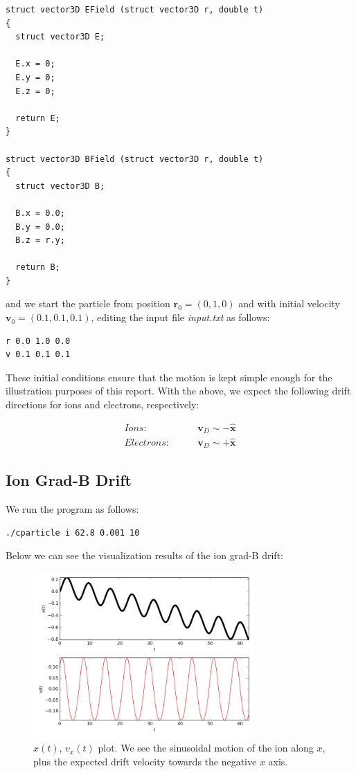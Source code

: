 \documentclass[11pt]{report}
\begin{document}
\begin{lstlisting}
struct vector3D EField (struct vector3D r, double t)
{
  struct vector3D E;

  E.x = 0;
  E.y = 0;
  E.z = 0;

  return E;
}

struct vector3D BField (struct vector3D r, double t)
{
  struct vector3D B;

  B.x = 0.0;
  B.y = 0.0;
  B.z = r.y;

  return B;
}
\end{lstlisting}

and we start the particle from position $\bm{r}_0 = (0, 1, 0)$ and with initial velocity $\bm{v}_0 = (0.1, 0.1, 0.1)$, editing the input file \emph{input.txt} as follows:

\begin{lstlisting}
r 0.0 1.0 0.0
v 0.1 0.1 0.1
\end{lstlisting}

These initial conditions ensure that the motion is kept simple enough for the illustration purposes of this report. With the above, we expect the following drift directions for ions and electrons, respectively:

\begin{align*}
Ions:& \quad \quad \bm{v}_D \sim -\bm{\hat{x}}\\
Electrons:&  \quad \quad \bm{v}_D \sim +\bm{\hat{x}}
\end{align*}
\newpage

\subsection{Ion Grad-B Drift}
We run the program as follows:

\begin{lstlisting}
./cparticle i 62.8 0.001 10
\end{lstlisting}

Below we can see the visualization results of the ion grad-B drift:

\begin{figure}[!ht]
  \centering
    \includegraphics[width=0.75\textwidth]{images/gradB_ion_x}
    \caption{$x(t)$, $v_x(t)$ plot. We see the sinusoidal motion of the ion along $x$, plus the expected drift velocity towards the negative $x$ axis.}
\end{figure}
\end{document}

